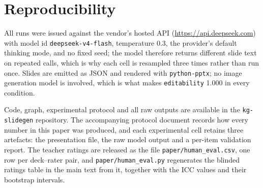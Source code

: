 \documentclass[11pt,a4paper]{article}
\newcommand{\id}[1]{\texttt{#1}}
\begin{document}
\section{Reproducibility}
\label{sec:s12}

All runs were issued against the vendor's hosted API
(\url{https://api.deepseek.com}) with model id \id{deepseek-v4-flash},
temperature 0.3, the provider's default thinking mode, and no fixed seed; the
model therefore returns different slide text on repeated calls, which is why each
cell is resampled three times rather than run once. Slides are emitted as JSON
and rendered with \id{python-pptx}; no image generation model is involved, which
is what makes \id{editability} 1.000 in every condition.


Code, graph, experimental protocol and all raw outputs are available in the
\id{kg-slidegen} repository. The accompanying protocol document records how every
number in this paper was produced, and each experimental cell retains three
artefacts: the presentation file, the raw model output and a per-item validation
report. The teacher ratings are released as the file
\id{paper/human\_eval.csv}, one row per deck--rater pair, and
\id{paper/human\_eval.py} regenerates the blinded ratings table in the main text
from it, together with the ICC values and their bootstrap intervals.

\end{document}
